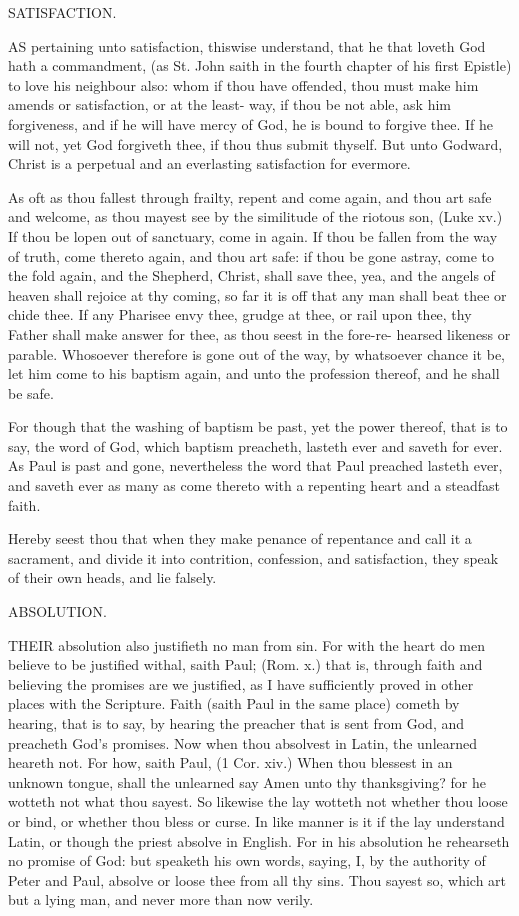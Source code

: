 SATISFACTION. 

AS pertaining unto satisfaction, thiswise understand, 
that he that loveth God hath a commandment, (as 
St. John saith in the fourth chapter of his first Epistle) 
to love his neighbour also: whom if thou have offended, 
thou must make him amends or satisfaction, or at the least- 
way, if thou be not able, ask him forgiveness, and if he will 
have mercy of God, he is bound to forgive thee. If he will 
not, yet God forgiveth thee, if thou thus submit thyself. 
But unto Godward, Christ is a perpetual and an everlasting 
satisfaction for evermore. 

As oft as thou fallest through frailty, repent and come 
again, and thou art safe and welcome, as thou mayest 
see by the similitude of the riotous son, (Luke xv.) 
If thou be lopen out of sanctuary, come in again. If 
thou be fallen from the way of truth, come thereto again, 
and thou art safe: if thou be gone astray, come to the fold 
again, and the Shepherd, Christ, shall save thee, yea, and the 
angels of heaven shall rejoice at thy coming, so far it is off 
that any man shall beat thee or chide thee. If any Pharisee
envy thee, grudge at thee, or rail upon thee, thy Father 
shall make answer for thee, as thou seest in the fore-re- 
hearsed likeness or parable. Whosoever therefore is gone 
out of the way, by whatsoever chance it be, let him come 
to his baptism again, and unto the profession thereof, and 
he shall be safe. 

For though that the washing of baptism be past, yet the 
power thereof, that is to say, the word of God, which 
baptism preacheth, lasteth ever and saveth for ever. As 
Paul is past and gone, nevertheless the word that Paul 
preached lasteth ever, and saveth ever as many as come 
thereto with a repenting heart and a steadfast faith. 

Hereby seest thou that when they make penance of repentance
and call it a sacrament, and divide it into contrition,
confession, and satisfaction, they speak of their own 
heads, and lie falsely. 


ABSOLUTION. 

THEIR absolution also justifieth no man from sin. For 
with the heart do men believe to be justified withal, 
saith Paul; (Rom. x.) that is, through faith and believing 
the promises are we justified, as I have sufficiently proved 
in other places with the Scripture. Faith (saith Paul in 
the same place) cometh by hearing, that is to say, by 
hearing the preacher that is sent from God, and preacheth 
God's promises. Now when thou absolvest in Latin, the 
unlearned heareth not. For how, saith Paul, (1 Cor. xiv.) 
When thou blessest in an unknown tongue, shall the unlearned
say Amen unto thy thanksgiving? for he wotteth not 
what thou sayest. So likewise the lay wotteth not whether 
thou loose or bind, or whether thou bless or curse. In 
like manner is it if the lay understand Latin, or though the 
priest absolve in English. For in his absolution he rehearseth
no promise of God: but speaketh his own words, 
saying, I, by the authority of Peter and Paul, absolve or 
loose thee from all thy sins. Thou sayest so, which art 
but a lying man, and never more than now verily. 

